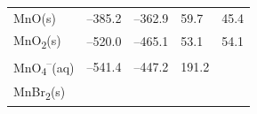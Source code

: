 \documentclass[
  9pt,
]{extbook}
\theoremstyle{definition}
\theoremstyle{definition}
\theoremstyle{definition}
\theoremstyle{remark}
\begin{document}
\begin{longtable}[]{@{}lllll@{}}
\begin{minipage}[t]{0.10\columnwidth}
MnO(s)\strut
\end{minipage} & \begin{minipage}[t]{0.19\columnwidth}\raggedright
--385.2\strut
\end{minipage} & \begin{minipage}[t]{0.20\columnwidth}\raggedright
--362.9\strut
\end{minipage} & \begin{minipage}[t]{0.18\columnwidth}\raggedright
59.7\strut
\end{minipage} & \begin{minipage}[t]{0.18\columnwidth}\raggedright
45.4\strut
\end{minipage}\tabularnewline
\begin{minipage}[t]{0.10\columnwidth}\raggedright
MnO\textsubscript{2}(s)\strut
\end{minipage} & \begin{minipage}[t]{0.19\columnwidth}\raggedright
--520.0\strut
\end{minipage} & \begin{minipage}[t]{0.20\columnwidth}\raggedright
--465.1\strut
\end{minipage} & \begin{minipage}[t]{0.18\columnwidth}\raggedright
53.1\strut
\end{minipage} & \begin{minipage}[t]{0.18\columnwidth}\raggedright
54.1\strut
\end{minipage}\tabularnewline
\begin{minipage}[t]{0.10\columnwidth}\raggedright
MnO\textsubscript{4}\textsuperscript{--}(aq)\strut
\end{minipage} & \begin{minipage}[t]{0.19\columnwidth}\raggedright
--541.4\strut
\end{minipage} & \begin{minipage}[t]{0.20\columnwidth}\raggedright
--447.2\strut
\end{minipage} & \begin{minipage}[t]{0.18\columnwidth}\raggedright
191.2\strut
\end{minipage} & \begin{minipage}[t]{0.18\columnwidth}\raggedright
\strut
\end{minipage}\tabularnewline
\begin{minipage}[t]{0.10\columnwidth}\raggedright
MnBr\textsubscript{2}(s)\strut
\end{minipage} & \begin{minipage}[t]{0.19\columnwidth}\raggedright

\end{minipage}
\end{longtable}
\end{document}
